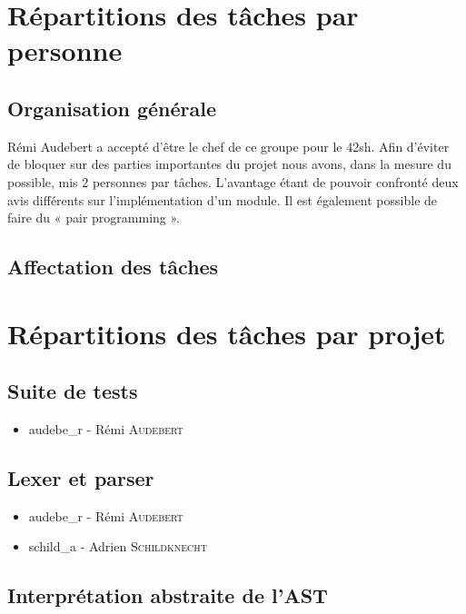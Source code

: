 \section{Répartitions des tâches par personne}

\subsection{Organisation générale}
Rémi Audebert a accepté d'être le chef de ce groupe pour le 42sh.
Afin d'éviter de bloquer sur des parties importantes du projet nous avons,
dans la mesure du possible, mis 2 personnes par tâches. L'avantage étant
de pouvoir confronté deux avis différents sur l'implémentation d'un module.
Il est également possible de faire du « pair programming ».

\subsection{Affectation des tâches}






\section{Répartitions des tâches par projet}

\subsection{Suite de tests}

\begin{itemize}
    \item audebe\_r - Rémi \textsc{Audebert}
\end{itemize}

\subsection{Lexer et parser}

\begin{itemize}
    \item audebe\_r - Rémi \textsc{Audebert}
    \item schild\_a - Adrien \textsc{Schildknecht}
\end{itemize}

\subsection{Interprétation abstraite de l'AST}

